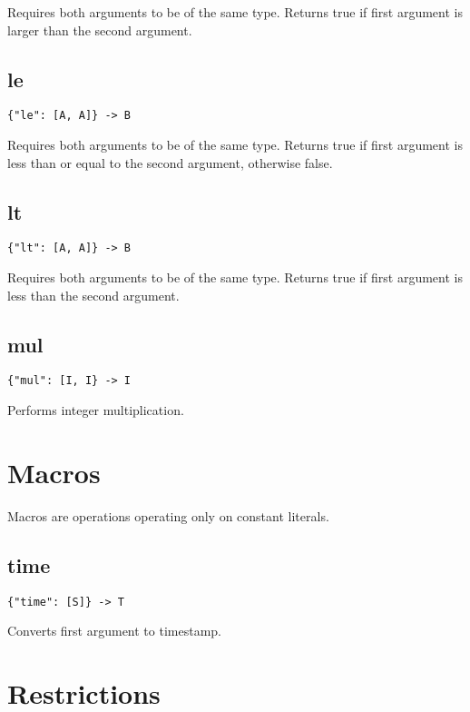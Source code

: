 \documentclass[a4paper]{article}
\begin{document}
Requires both arguments to be of the same type. Returns true if first
argument is larger than the second argument.

\subsection{le}

\begin{verbatim}
{"le": [A, A]} -> B
\end{verbatim}

Requires both arguments to be of the same type. Returns true if first
argument is less than or equal to the second argument, otherwise
false.

\subsection{lt}

\begin{verbatim}
{"lt": [A, A]} -> B
\end{verbatim}

Requires both arguments to be of the same type. Returns true if first
argument is less than the second argument.

\subsection{mul}

\begin{verbatim}
{"mul": [I, I} -> I
\end{verbatim}

Performs integer multiplication.

\section{Macros}

Macros are operations operating only on constant literals.

\subsection{time}

\begin{verbatim}
{"time": [S]} -> T
\end{verbatim}

Converts first argument to timestamp. 

\section{Restrictions}
\end{document}
